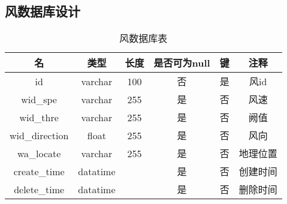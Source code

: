 \subsection{风数据库设计}
\begin{table}[H]
	\centering
	\caption[风数据]{风数据库表}
	\begin{tabular}{cccccc}
		\toprule
		名            & 类型      & 长度 &是否可为null & 键 & 注释\\
		\midrule
		id            & varchar  & 100  & 否 & 是 & 风id \\
		wid\_spe      & varchar  & 255  &是  & 否 & 风速   \\
		wid\_thre      & varchar  & 255  &是  & 否 & 阙值   \\
		wid\_direction   & float    & 255  &是  & 否 & 风向 \\
		wa\_locate   & varchar    & 255  & 是 & 否 & 地理位置     \\
		create\_time  & datatime &      &是  & 否 & 创建时间   \\
		delete\_time  &datatime  &      & 是 & 否 & 删除时间   \\ 
		\bottomrule
	\end{tabular}
\end{table}


